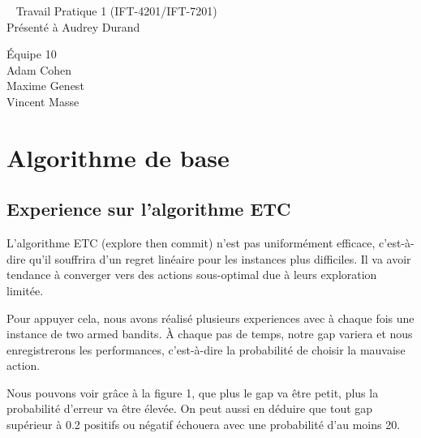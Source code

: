 \documentclass[letterpaper,11pt]{article}
\begin{document}
\begin{center}
~
\vfill
\LARGE{Travail Pratique 1 (IFT-4201/IFT-7201)}\\[0.4cm]

\Large{Présenté à Audrey Durand}

\vfill
\large{Équipe 10 \\ Adam Cohen \\ Maxime Genest \\ Vincent Masse}

\vfill
\thispagestyle{empty}

\end{center}
\clearpage

\pagestyle{fancy}


%

\section{Algorithme de base}

\subsection{Experience sur l'algorithme ETC}
L'algorithme ETC (explore then commit) n'est pas uniformément efficace, c'est-à-dire qu'il souffrira d'un regret linéaire pour les instances plus difficiles.
Il va avoir tendance à converger vers des actions sous-optimal due à leurs exploration limitée.

Pour appuyer cela, nous avons réalisé plusieurs experiences avec à chaque fois une instance de two armed bandits.
À chaque pas de temps, notre gap variera et nous enregistrerons les performances, c'est-à-dire la probabilité de choisir la mauvaise action.

Nous pouvons voir grâce à la figure 1, que plus le gap va être petit, plus la probabilité d'erreur va être élevée. On peut aussi en déduire que tout gap supérieur à 0.2 positifs ou négatif échouera avec une probabilité d’au moins 20.
\end{document}
